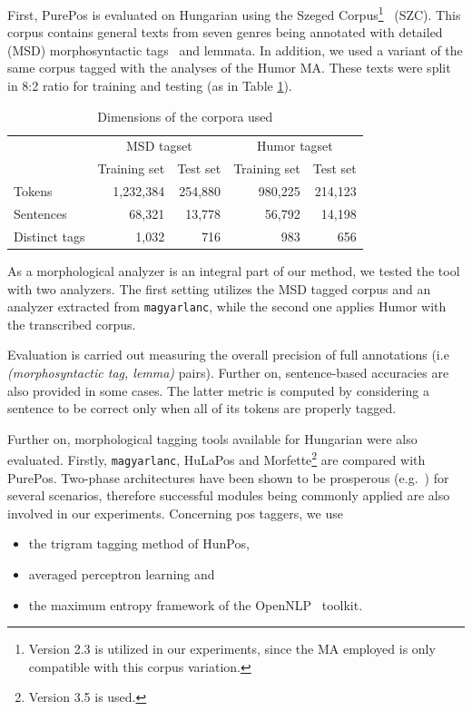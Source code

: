 First, PurePos is evaluated on Hungarian using the Szeged Corpus\footnote{Version 2.3 is utilized in our experiments, since the MA employed is only compatible with this corpus variation.}~\cite{Csendes2004} (SZC). 
This corpus contains general texts from seven genres being annotated with detailed (MSD) morphosyntactic tags~\cite{Erjavec2012} and lemmata.
In addition, we used a variant of the same corpus tagged with the analyses of the Humor MA. These texts were split in 8:2 ratio for training and testing (as in Table \ref{tab:szeged-corpus}). 

\begin{table}[ht]
\centering
\caption{Dimensions of the corpora used}
\begin{tabular}{l r r r r}
  \hline
  & \multicolumn{2}{c}{MSD tagset} & \multicolumn{2}{c}{Humor tagset} \\
  &  Training set &  Test set &  Training set &  Test set  \\
  \hline
  Tokens &  1,232,384 &  254,880 &  980,225 &  214,123 \\
  Sentences &  68,321 &  13,778 &  56,792 &  14,198 \\
  Distinct tags &  1,032 &  716 &  983 &  656 \\
  \hline
\end{tabular}
\label{tab:szeged-corpus}
\end{table}

As a morphological analyzer is an integral part of our method, we tested the tool with two analyzers. 
The first setting utilizes the MSD tagged corpus and an analyzer extracted from \texttt{magyarlanc}, while the second one applies Humor with the transcribed corpus.

Evaluation is carried out measuring the overall precision of full annotations (i.e \emph{(morphosyntactic tag, lemma)} pairs). 
Further on, sentence-based accuracies are also provided in some cases. 
The latter metric is computed by considering a sentence to be correct only when all of its tokens are properly tagged. 

Further on, morphological tagging tools available for Hungarian were also evaluated. 
Firstly, \texttt{magyarlanc}, HuLaPos and Morfette\footnote{Version 3.5 is used.} are compared with PurePos.  
Two-phase architectures have been shown to be prosperous (e.g.~\cite{Agic2013,Erjavec2004}) for several scenarios, therefore successful modules being commonly applied are also involved in our experiments. 
Concerning \gls{pos} taggers, we use
\begin{itemize}
  \item the trigram tagging method of HunPos,
  \item averaged perceptron learning and
  \item the maximum entropy framework of the OpenNLP~\cite{Baldridge2002} toolkit.
\end{itemize}

